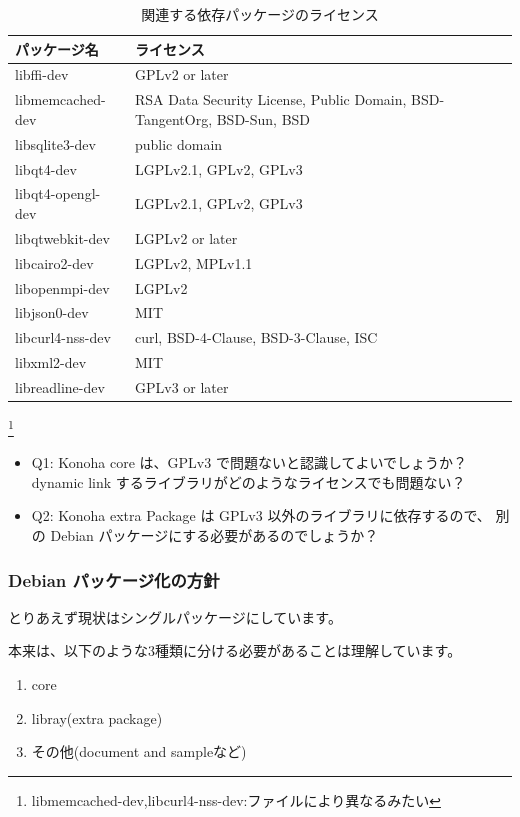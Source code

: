 \documentclass[mingoth,a4paper]{jsarticle}
\begin{document}
\begin{table}[ht]
 \caption{関連する依存パッケージのライセンス}
 \label{tab:konoha-licenses}
\begin{center}
  \begin{tabular}{|l|l|}
 \hline
 パッケージ名 & ライセンス \\
 \hline
  libffi-dev        & GPLv2 or later \\
  libmemcached-dev  & RSA Data Security License, Public Domain, BSD-TangentOrg, BSD-Sun, BSD\\
  libsqlite3-dev    & public domain\\
  libqt4-dev        & LGPLv2.1, GPLv2, GPLv3\\
  libqt4-opengl-dev & LGPLv2.1, GPLv2, GPLv3\\
  libqtwebkit-dev   & LGPLv2 or later\\
  libcairo2-dev     & LGPLv2, MPLv1.1\\
  libopenmpi-dev    & LGPLv2\\
  libjson0-dev      & MIT \\
  libcurl4-nss-dev  & curl, BSD-4-Clause, BSD-3-Clause, ISC\\
  libxml2-dev       & MIT \\
  libreadline-dev   & GPLv3 or later\\
 \hline
 \end{tabular}
\end{center}
\end{table}
\footnote{libmemcached-dev,libcurl4-nss-dev:ファイルにより異なるみたい}

\begin{itemize}
\item Q1: Konoha core は、GPLv3 で問題ないと認識してよいでしょうか？\\
dynamic link するライブラリがどのようなライセンスでも問題ない？
\item Q2: Konoha extra Package は GPLv3 以外のライブラリに依存するので、
別の Debian パッケージにする必要があるのでしょうか？
\end{itemize}

\subsubsection{Debian パッケージ化の方針}
とりあえず現状はシングルパッケージにしています。

本来は、以下のような3種類に分ける必要があることは理解しています。

\begin{enumerate}
\item core
\item libray(extra package)
\item その他(document and sampleなど)
\end{enumerate}
\end{document}
